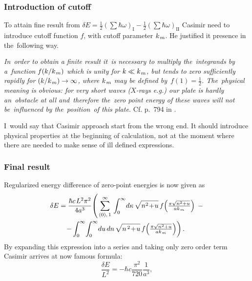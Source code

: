 \documentclass[10pt,t]{beamer}
\begin{document}
\begin{frame}
  \frametitle{Introduction of cutoff}


  To attain fine result from
  $\delta E = \frac{ 1 }{ 2 } ( \sum \hbar \omega )_{ \text{I} } -
  \frac{ 1 }{ 2 } ( \sum \hbar \omega )_{ \text{II} }$ Casimir need to introduce
  cutoff function $f$, with cutoff parameter $k_{ \hspace{0.09em} m }$. He
  justified it presence in the~following way.

  \textit{In~order to obtain a finite result it~is necessary to multiply
    the~integrands by a~function $f( k / k_{ \hspace{0.09em} m } )$ which is
    unity for $k \ll k_{ \hspace{0.09em} m }$, but tends to zero sufficiently
    rapidly for $( k / k_{ \hspace{0.09em} m } ) \to \infty$, where
    $k_{ \hspace{0.09em} m }$ may be defined by~$f( 1 ) = \frac{ 1 }{ 2 }$.
    The~physical meaning is obvious: for very short waves ($X$-rays e.g.)
    our plate is hardly an~obstacle at all and~therefore the~zero point
    energy of these waves will not be~influenced by the~position~of this
    plate.} Cf. p.~794 in
  \parencite{Casimir-On-the-Attraction-Between-ETC-Pub-1948}.

  I~would say that Casimir approach start from the wrong end. It should
  introduce physical properties at the beginning of calculation, not at
  the moment where there are needed to make sense of ill defined expressions.

\end{frame}





\begin{frame}
  \frametitle{Final result}


  Regularized energy difference of zero-point energies is now given as
  \begin{equation}
    \label{eq:Oryginalna-praca-ETC-05}
    \begin{split}
      \delta E
      &=
      \frac{ \hbar c \HorSpaceFive L^{ 2 } \pi^{ 2 } }{ 4 a^{ 3 } } \!
      \left( \, \sum_{ ( 0 ), \, 1 }^{ \infty } \,
      \int_{ 0 }^{ \infty } \! d\kappa \, \sqrt{ n^{ 2 } \! + \! u } \,
      f\!\left( \tfrac{ \pi \sqrt{ n^{ 2 } + u } }{ a k_{ \HorSpaceTwo m } }
      \right) \right. \, - \\
      &\left. \;\;\;
        - \int_{ 0 }^{ \infty } \! \int_{ 0 }^{ \infty } \! du \, dn \,
      \sqrt{ n^{ \, 2 } \! + \! u } \,
      f\!\left( \tfrac{ \pi \sqrt{ n^{ 2 } + u } }{
      a k_{ \HorSpaceTwo m } } \right) \right).
      \end{split}
    \end{equation}
  By expanding this expression into a series and taking only zero order term
  Casimir arrives at now famous formula:
  \begin{equation}
    \label{eq:Oryginalna-praca-ETC-06}
    \frac{ \delta E }{ L^{ 2 } } =
    -\hbar c \frac{ \pi^{ 2 } }{ 720 } \frac{ 1 }{ a^{ 3 } },
  \end{equation}

\end{frame}
\end{document}
